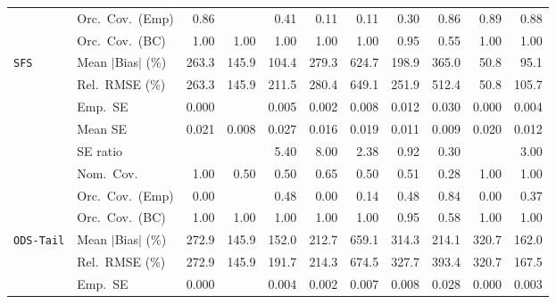 \begin{landscape}
\begin{longtable}{llrrrrrrrrr}
 & Orc.\ Cov.\ (Emp) & \cellcolor{rankthree}0.86 &  & 0.41 & 0.11 & 0.11 & 0.30 & \cellcolor{rankthree}0.86 & \cellcolor{rankone}0.89 & \cellcolor{ranktwo}0.88 \\
 & Orc.\ Cov.\ (BC) & \cellcolor{ranktwo}1.00 & \cellcolor{ranktwo}1.00 & \cellcolor{ranktwo}1.00 & \cellcolor{ranktwo}1.00 & \cellcolor{ranktwo}1.00 & \cellcolor{rankone}0.95 & \cellcolor{rankthree}0.55 & \cellcolor{ranktwo}1.00 & \cellcolor{ranktwo}1.00 \\
\addlinespace[2pt]
\quad \texttt{SFS} & Mean $|$Bias$|$ (\%) & 263.3 & 145.9 & \cellcolor{rankthree}104.4 & 279.3 & 624.7 & 198.9 & 365.0 & \cellcolor{rankone}50.8 & \cellcolor{ranktwo}95.1 \\
 & Rel.\ RMSE (\%) & 263.3 & \cellcolor{rankthree}145.9 & 211.5 & 280.4 & 649.1 & 251.9 & 512.4 & \cellcolor{rankone}50.8 & \cellcolor{ranktwo}105.7 \\
 & Emp.\ SE & 0.000 &  & 0.005 & 0.002 & 0.008 & 0.012 & 0.030 & 0.000 & 0.004 \\
 & Mean SE & 0.021 & 0.008 & 0.027 & 0.016 & 0.019 & 0.011 & 0.009 & 0.020 & 0.012 \\
 & SE ratio &  &  & 5.40 & 8.00 & \cellcolor{rankthree}2.38 & \cellcolor{rankone}0.92 & \cellcolor{ranktwo}0.30 &  & 3.00 \\
 & Nom.\ Cov. & \cellcolor{rankone}1.00 & 0.50 & 0.50 & \cellcolor{ranktwo}0.65 & 0.50 & \cellcolor{rankthree}0.51 & 0.28 & \cellcolor{rankone}1.00 & \cellcolor{rankone}1.00 \\
 & Orc.\ Cov.\ (Emp) & 0.00 &  & \cellcolor{ranktwo}0.48 & 0.00 & 0.14 & \cellcolor{ranktwo}0.48 & \cellcolor{rankone}0.84 & 0.00 & \cellcolor{rankthree}0.37 \\
 & Orc.\ Cov.\ (BC) & \cellcolor{ranktwo}1.00 & \cellcolor{ranktwo}1.00 & \cellcolor{ranktwo}1.00 & \cellcolor{ranktwo}1.00 & \cellcolor{ranktwo}1.00 & \cellcolor{rankone}0.95 & \cellcolor{rankthree}0.58 & \cellcolor{ranktwo}1.00 & \cellcolor{ranktwo}1.00 \\
\addlinespace[2pt]
\quad \texttt{ODS-Tail} & Mean $|$Bias$|$ (\%) & 272.9 & \cellcolor{rankone}145.9 & \cellcolor{ranktwo}152.0 & 212.7 & 659.1 & 314.3 & 214.1 & 320.7 & \cellcolor{rankthree}162.0 \\
 & Rel.\ RMSE (\%) & 272.9 & \cellcolor{rankone}145.9 & \cellcolor{rankthree}191.7 & 214.3 & 674.5 & 327.7 & 393.4 & 320.7 & \cellcolor{ranktwo}167.5 \\
 & Emp.\ SE & 0.000 &  & 0.004 & 0.002 & 0.007 & 0.008 & 0.028 & 0.000 & 0.003 \\

\end{longtable}
\end{landscape}

